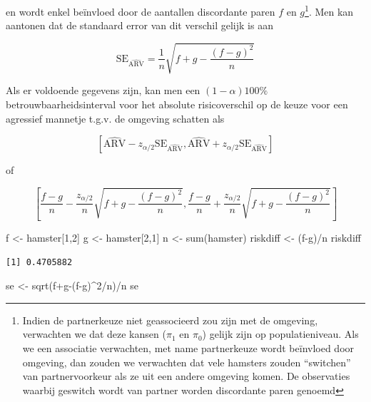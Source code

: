 \documentclass[
  dutch,
  letterpaper,
  12pt]{book}
\newenvironment{Shaded}{\begin{snugshade}}{\end{snugshade}}
\newcommand{\DecValTok}[1]{\textcolor[rgb]{0.68,0.00,0.00}{#1}}
\newcommand{\FunctionTok}[1]{\textcolor[rgb]{0.28,0.35,0.67}{#1}}
\newcommand{\NormalTok}[1]{\textcolor[rgb]{0.00,0.23,0.31}{#1}}
\newcommand{\OtherTok}[1]{\textcolor[rgb]{0.00,0.23,0.31}{#1}}
\newcommand{\SpecialCharTok}[1]{\textcolor[rgb]{0.37,0.37,0.37}{#1}}
\theoremstyle{definition}
\theoremstyle{definition}
\theoremstyle{definition}
\theoremstyle{remark}
\begin{document}
en wordt enkel beïnvloed door de aantallen discordante paren \(f\) en
\(g\)\footnote{Indien de partnerkeuze niet geassocieerd zou zijn met de
  omgeving, verwachten we dat deze kansen (\(\pi_1\) en \(\pi_0\))
  gelijk zijn op populatieniveau. Als we een associatie verwachten, met
  name partnerkeuze wordt beïnvloed door omgeving, dan zouden we
  verwachten dat vele hamsters zouden ``switchen'' van partnervoorkeur
  als ze uit een andere omgeving komen. De observaties waarbij geswitch
  wordt van partner worden discordante paren genoemd}. Men kan aantonen
dat de standaard error van dit verschil gelijk is aan

\begin{equation*}
\text{SE}_{\widehat{\text{ARV}}}=\frac{1}{n}\sqrt{f+g-\frac{(f-g)^2}{n}}
\end{equation*}

Als er voldoende gegevens zijn, kan men een \((1-\alpha)100\%\)
betrouwbaarheidsinterval voor het absolute risicoverschil op de keuze
voor een agressief mannetje t.g.v. de omgeving schatten als

\[\left[\widehat{\text{ARV}}-z_{\alpha/2}\text{SE}_{\widehat{\text{ARV}}},\widehat{\text{ARV}}+z_{\alpha/2}\text{SE}_{\widehat{\text{ARV}}}\right]\]

of

\[\left[\frac{f-g}{n}-\frac{z_{\alpha/2}}{n}\sqrt{f+g-\frac{(f-g)^2}{n}},\frac{f-g}{n}+\frac{z_{\alpha/2}}{n}\sqrt{f+g-\frac{(f-g)^2}{n}}\right] \]

\begin{Shaded}
\begin{Highlighting}[]
\NormalTok{f }\OtherTok{\textless{}{-}}\NormalTok{ hamster[}\DecValTok{1}\NormalTok{,}\DecValTok{2}\NormalTok{]}
\NormalTok{g }\OtherTok{\textless{}{-}}\NormalTok{ hamster[}\DecValTok{2}\NormalTok{,}\DecValTok{1}\NormalTok{]}
\NormalTok{n }\OtherTok{\textless{}{-}} \FunctionTok{sum}\NormalTok{(hamster)}
\NormalTok{riskdiff }\OtherTok{\textless{}{-}}\NormalTok{ (f}\SpecialCharTok{{-}}\NormalTok{g)}\SpecialCharTok{/}\NormalTok{n}
\NormalTok{riskdiff}
\end{Highlighting}
\end{Shaded}

\begin{verbatim}
[1] 0.4705882
\end{verbatim}

\begin{Shaded}
\begin{Highlighting}[]
\NormalTok{se }\OtherTok{\textless{}{-}} \FunctionTok{sqrt}\NormalTok{(f}\SpecialCharTok{+}\NormalTok{g}\SpecialCharTok{{-}}\NormalTok{(f}\SpecialCharTok{{-}}\NormalTok{g)}\SpecialCharTok{\^{}}\DecValTok{2}\SpecialCharTok{/}\NormalTok{n)}\SpecialCharTok{/}\NormalTok{n}
\NormalTok{se}
\end{Highlighting}
\end{Shaded}
\end{document}
